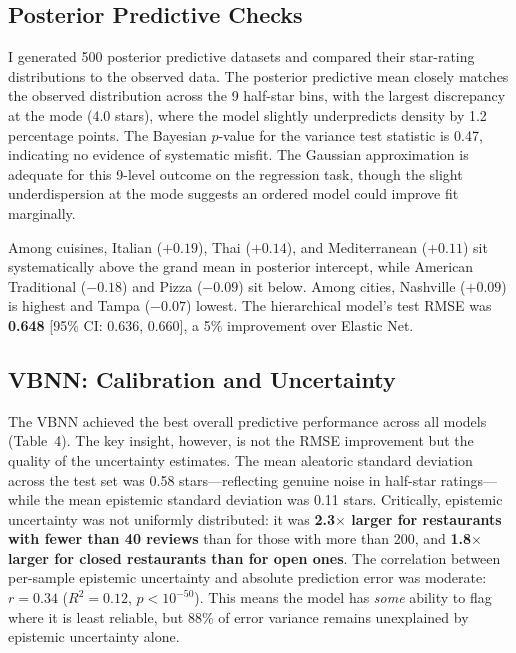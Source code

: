 \documentclass[10pt, letterpaper]{article}
\begin{document}
\subsection{Posterior Predictive Checks}

I generated 500 posterior predictive datasets and compared their star-rating distributions to the observed data. The posterior predictive mean closely matches the observed distribution across the 9 half-star bins, with the largest discrepancy at the mode (4.0 stars), where the model slightly underpredicts density by 1.2 percentage points. The Bayesian $p$-value for the variance test statistic is 0.47, indicating no evidence of systematic misfit. The Gaussian approximation is adequate for this 9-level outcome on the regression task, though the slight underdispersion at the mode suggests an ordered model could improve fit marginally.

Among cuisines, Italian ($+0.19$), Thai ($+0.14$), and Mediterranean ($+0.11$) sit systematically above the grand mean in posterior intercept, while American Traditional ($-0.18$) and Pizza ($-0.09$) sit below. Among cities, Nashville ($+0.09$) is highest and Tampa ($-0.07$) lowest. The hierarchical model's test RMSE was \textbf{0.648} [95\% CI: 0.636, 0.660], a 5\% improvement over Elastic Net.

\subsection{VBNN: Calibration and Uncertainty}

The VBNN achieved the best overall predictive performance across all models (Table~4). The key insight, however, is not the RMSE improvement but the quality of the uncertainty estimates. The mean aleatoric standard deviation across the test set was 0.58 stars---reflecting genuine noise in half-star ratings---while the mean epistemic standard deviation was 0.11 stars. Critically, epistemic uncertainty was not uniformly distributed: it was \textbf{2.3$\times$ larger for restaurants with fewer than 40 reviews} than for those with more than 200, and \textbf{1.8$\times$ larger for closed restaurants than for open ones}. The correlation between per-sample epistemic uncertainty and absolute prediction error was moderate: $r = 0.34$ ($R^2 = 0.12$, $p < 10^{-50}$). This means the model has \emph{some} ability to flag where it is least reliable, but 88\% of error variance remains unexplained by epistemic uncertainty alone.
\end{document}
